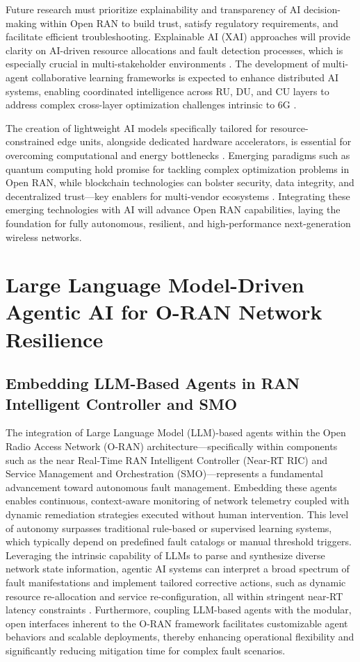 \documentclass[sigconf]{acmart}
\begin{document}
Future research must prioritize explainability and transparency of AI decision-making within Open RAN to build trust, satisfy regulatory requirements, and facilitate efficient troubleshooting. Explainable AI (XAI) approaches will provide clarity on AI-driven resource allocations and fault detection processes, which is especially crucial in multi-stakeholder environments \cite{ref54}. The development of multi-agent collaborative learning frameworks is expected to enhance distributed AI systems, enabling coordinated intelligence across RU, DU, and CU layers to address complex cross-layer optimization challenges intrinsic to 6G \cite{ref48}.

The creation of lightweight AI models specifically tailored for resource-constrained edge units, alongside dedicated hardware accelerators, is essential for overcoming computational and energy bottlenecks \cite{ref50}. Emerging paradigms such as quantum computing hold promise for tackling complex optimization problems in Open RAN, while blockchain technologies can bolster security, data integrity, and decentralized trust—key enablers for multi-vendor ecosystems \cite{ref54}. Integrating these emerging technologies with AI will advance Open RAN capabilities, laying the foundation for fully autonomous, resilient, and high-performance next-generation wireless networks.

\section{Large Language Model-Driven Agentic AI for O-RAN Network Resilience}

\subsection{Embedding LLM-Based Agents in RAN Intelligent Controller and SMO}

The integration of Large Language Model (LLM)-based agents within the Open Radio Access Network (O-RAN) architecture—specifically within components such as the near Real-Time RAN Intelligent Controller (Near-RT RIC) and Service Management and Orchestration (SMO)—represents a fundamental advancement toward autonomous fault management. Embedding these agents enables continuous, context-aware monitoring of network telemetry coupled with dynamic remediation strategies executed without human intervention. This level of autonomy surpasses traditional rule-based or supervised learning systems, which typically depend on predefined fault catalogs or manual threshold triggers. Leveraging the intrinsic capability of LLMs to parse and synthesize diverse network state information, agentic AI systems can interpret a broad spectrum of fault manifestations and implement tailored corrective actions, such as dynamic resource re-allocation and service re-configuration, all within stringent near-RT latency constraints \cite{ref55}. Furthermore, coupling LLM-based agents with the modular, open interfaces inherent to the O-RAN framework facilitates customizable agent behaviors and scalable deployments, thereby enhancing operational flexibility and significantly reducing mitigation time for complex fault scenarios.
\end{document}
